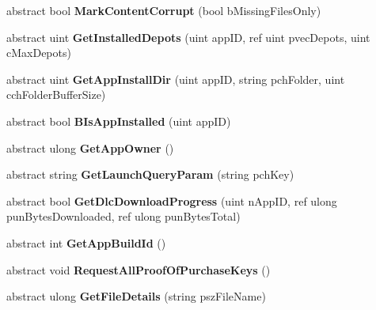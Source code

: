 \begin{DoxyCompactItemize}
\mbox{\label{class_valve_1_1_steamworks_1_1_i_steam_apps_ad01716209399450a37f52b3db03e8fc0}} 
abstract bool {\bfseries Mark\+Content\+Corrupt} (bool b\+Missing\+Files\+Only)
\item 
\mbox{\label{class_valve_1_1_steamworks_1_1_i_steam_apps_a83c93fe07db04f0e56b86e91c1366a23}} 
abstract uint {\bfseries Get\+Installed\+Depots} (uint app\+ID, ref uint pvec\+Depots, uint c\+Max\+Depots)
\item 
\mbox{\label{class_valve_1_1_steamworks_1_1_i_steam_apps_aa57cfb5a8f19dada66cde96db63db625}} 
abstract uint {\bfseries Get\+App\+Install\+Dir} (uint app\+ID, string pch\+Folder, uint cch\+Folder\+Buffer\+Size)
\item 
\mbox{\label{class_valve_1_1_steamworks_1_1_i_steam_apps_ac8d7a107007a69f3a295d9001c590473}} 
abstract bool {\bfseries B\+Is\+App\+Installed} (uint app\+ID)
\item 
\mbox{\label{class_valve_1_1_steamworks_1_1_i_steam_apps_a4a2f5c9fba081170757ed6e9a9d08bc7}} 
abstract ulong {\bfseries Get\+App\+Owner} ()
\item 
\mbox{\label{class_valve_1_1_steamworks_1_1_i_steam_apps_a0b6a32da2410f10420b9c5341473026f}} 
abstract string {\bfseries Get\+Launch\+Query\+Param} (string pch\+Key)
\item 
\mbox{\label{class_valve_1_1_steamworks_1_1_i_steam_apps_acd2ca6d039e750934907100279ff166f}} 
abstract bool {\bfseries Get\+Dlc\+Download\+Progress} (uint n\+App\+ID, ref ulong pun\+Bytes\+Downloaded, ref ulong pun\+Bytes\+Total)
\item 
\mbox{\label{class_valve_1_1_steamworks_1_1_i_steam_apps_a44931c736316a7ea15879d888872b2aa}} 
abstract int {\bfseries Get\+App\+Build\+Id} ()
\item 
\mbox{\label{class_valve_1_1_steamworks_1_1_i_steam_apps_a6d33793af44e0754b78b297634a640b5}} 
abstract void {\bfseries Request\+All\+Proof\+Of\+Purchase\+Keys} ()
\item 
\mbox{\label{class_valve_1_1_steamworks_1_1_i_steam_apps_a17e6d381f3bf2cdb8a3cca05ffbbe3f3}} 
abstract ulong {\bfseries Get\+File\+Details} (string psz\+File\+Name)
\end{DoxyCompactItemize}


